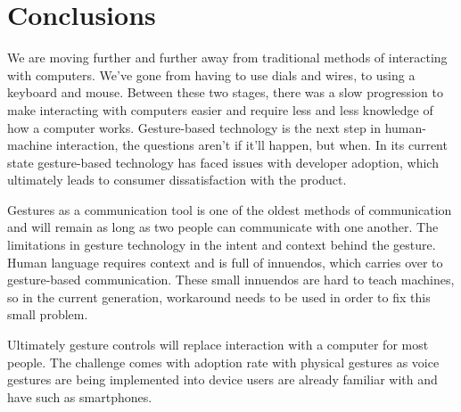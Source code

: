\chapter{Conclusions}
We are moving further and further away from traditional methods of interacting with computers. We've gone from having to use dials and wires, to using a keyboard and mouse. Between these two stages, there was a slow progression to make interacting with computers easier and require less and less knowledge of how a computer works. Gesture-based technology is the next step in human-machine interaction, the questions aren't if it'll happen, but when. In its current state gesture-based technology has faced issues with developer adoption, which ultimately leads to consumer dissatisfaction with the product. 

Gestures as a communication tool is one of the oldest methods of communication and will remain as long as two people can communicate with one another. The limitations in gesture technology in the intent and context behind the gesture. Human language requires context and is full of innuendos, which carries over to gesture-based communication. These small innuendos are hard to teach machines, so in the current generation, workaround needs to be used in order to fix this small problem.

Ultimately gesture controls will replace interaction with a computer for most people. The challenge comes with adoption rate with physical gestures as voice gestures are being implemented into device users are already familiar with and have such as smartphones.